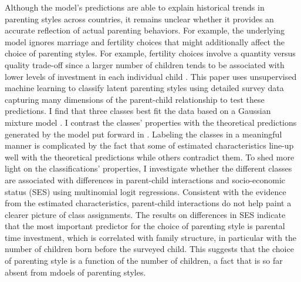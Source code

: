 Although the model's predictions are able to explain historical trends in parenting styles across countries, it remains unclear whether it provides an accurate reflection of actual parenting behaviors. For example, the underlying model ignores marriage and fertility choices that might additionally affect the choice of parenting styles. For example, fertility choices involve a quantity versus quality trade-off since a larger number of children tends to be associated with lower levels of investment in each individual child \textcite{beckerTreatiseFamily1981}.
This paper uses unsupervised machine learning to classify latent parenting styles using detailed survey data capturing many dimensions of the parent-child relationship to test these predictions. I find that three classes best fit the data based on a Gaussian mixture model \parencite[e.g.][]{hastieElementsStatisticalLearning2009}. I contrast the classes' properties with the theoretical predictions generated by the model put forward in \textcite{doepkeParentingStyleAltruism2017}. Labeling the classes in a meaningful manner is complicated by the fact that some of estimated characteristics line-up well with the theoretical predictions while others contradict them.
To shed more light on the classifications' properties, I investigate whether the different classes are associated with differences in parent-child interactions and socio-economic status (SES) using multinomial logit regressions. Consistent with the evidence from the estimated characteristics,  parent-child interactions do not help paint a clearer picture of class assignments. The results on differences in SES indicate that the most important predictor for the choice of parenting style is parental time investment, which is correlated with family structure, in particular with the number of children born before the surveyed child. This suggests that the choice of parenting style is a function of the number of children, a fact that is so far absent from mdoels of parenting styles.


